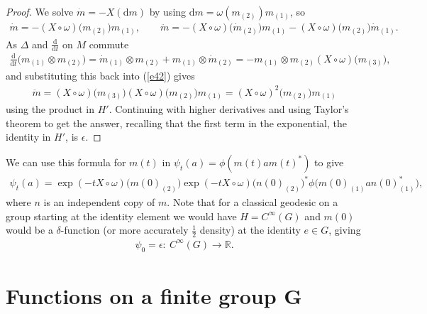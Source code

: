 \documentclass[pdftex]{sigma}
\numberwithin{equation}{section}
\newcommand{\extd}{\mathrm{d}}
\newcommand{\tens}{\mathop{\otimes}}
\newcommand{\R}{\mathbb{R}}
\newcommand{\<}{\langle}
\renewcommand{\>}{\rangle}
\begin{document}
\begin{proof}
	We solve $ \dot{m}=-X (\extd m ) $ by using $ \extd m= \omega (m_{(2)}) m_{(1)}$, so
	\begin{gather}\label{e42}
	\dot{m}=- (X \circ\omega )\big(m_{(2)}\big) m_{(1)},\qquad	\ddot{m}=- ( X\circ\omega )\big(\dot{m}_{(2)}\big) m_{(1)} - ( X\circ\omega ) \big(m_{(2)}\big) \dot{m}_{(1)}.
	\end{gather}
	As $ \Delta $ and $ 	\frac{\extd}{\extd t} $ on $ M $ commute
	\begin{gather*}
	\frac{\extd}{\extd t} \big(m_{(1)} \tens m_{(2)}\big) =\dot {m}_{(1)} \tens m_{(2)}+ m_{(1)} \tens \dot {m}_{(2)}=- m_{(1)}\tens m_{(2)} ( X\circ\omega )\big(m_{(3)}\big),
	\end{gather*}
	and substituting this back into (\ref{e42}) gives
	\begin{gather*}
	\ddot{m}=( X\circ\omega ) \big(m_{(3)}\big) ( X\circ\omega ) \big(m_{(2)}\big) m_{(1)} =( X\circ\omega )^{2}\big(m_{(2)}\big) m_{(1)}
	\end{gather*}
using the product in $ H'$. Continuing with higher derivatives and using Taylor's theorem to get the answer, recalling that the first term in the exponential, the identity in $ H' $, is $ \epsilon $.
\end{proof}

We can use this formula for $ m(t) $ in $ \psi_t(a)=\phi(m(t) a m(t)^{*}) $ to give
\begin{gather}\label{e68}
	\psi_t(a)=\exp (-tX \circ \omega) \big(m(0)_{(2)}\big) \exp (-tX \circ \omega) \big(n(0)_{(2)}\big) ^{*} \phi \big(m(0)_{(1)} a n (0)_{(1)}^{*}\big),
\end{gather}
where $ n $ is an independent copy of $m$. Note that for a classical geodesic on a group starting at the identity element we would have $ H= C^{\infty}(G) $ and $ m(0) $ would be a $ \delta $-function (or more accurately $ \frac{1}{2} $ density) at the identity $ e\in G $, giving
\begin{gather*}
	\psi_0= \epsilon\colon \ C^{\infty}(G) \rightarrow \R.
\end{gather*}

 \section[Functions on a finite group G]{Functions on a finite group $\boldsymbol{G}$} \label{S1}
\end{document}
